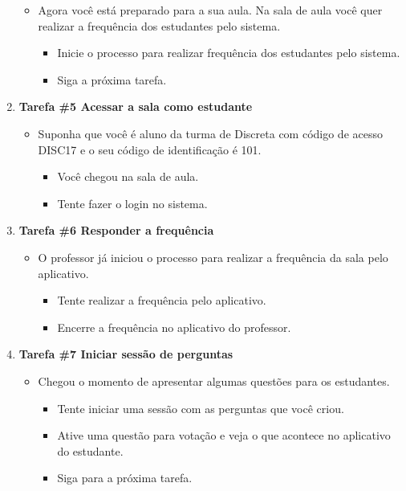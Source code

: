 \begin{apendicesenv}
\begin{enumerate}
  \begin{itemize}
    \item Agora você está preparado para a sua aula. Na sala de aula você quer realizar a frequência dos estudantes pelo sistema.
    \begin{itemize}
      \item Inicie o processo para realizar frequência dos estudantes pelo sistema.
      \item Siga a próxima tarefa.
    \end{itemize}
  \end{itemize}

  \item \textbf{Tarefa \#5 Acessar a sala como estudante}
  \begin{itemize}
    \item Suponha que você é aluno da turma de Discreta com código de acesso DISC17 e o seu código de identificação é 101.
    \begin{itemize}
      \item Você chegou na sala de aula.
      \item Tente fazer o login no sistema.
    \end{itemize}
  \end{itemize}

  \item \textbf{Tarefa \#6 Responder a frequência}
  \begin{itemize}
    \item O professor já iniciou o processo para realizar a frequência da sala pelo aplicativo.
    \begin{itemize}
      \item Tente realizar a frequência pelo aplicativo.
      \item Encerre a frequência no aplicativo do professor.
    \end{itemize}
  \end{itemize}

  \item \textbf{Tarefa \#7 Iniciar sessão de perguntas}
  \begin{itemize}
    \item Chegou o momento de apresentar algumas questões para os estudantes.
    \begin{itemize}
      \item Tente iniciar uma sessão com as perguntas que você criou.
      \item Ative uma questão para votação e veja o que acontece no aplicativo do estudante.
      \item Siga para a próxima tarefa.
    \end{itemize}
  \end{itemize}


\end{enumerate}
\end{apendicesenv}
